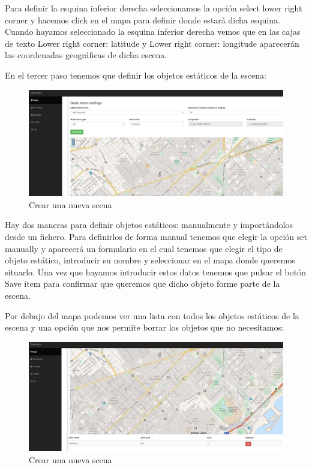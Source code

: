 Para definir la esquina inferior derecha seleccionamos la opción select lower right corner y hacemos click en el mapa para definir donde estará dicha esquina. Cuando hayamos seleccionado la esquina inferior derecha vemos que en las cajas de texto Lower right corner: latitude y Lower right corner: longitude aparecerán las coordenadas geográficas de dicha escena.

En el tercer paso tenemos que definir los objetos estáticos de la escena:

\begin{figure}[H]
	\centering\includegraphics[scale=0.3]{imagenes/capitulo9/crear-escena-3-1.jpg}
	\caption{Crear una nueva scena}
	\label{img:AddScena31}
\end{figure}

Hay dos maneras para definir objetos estáticos: manualmente y importándolos desde un fichero. Para definirlos de forma manual tenemos que elegir la opción set manually y aparecerá un formulario en el cual tenemos que elegir el tipo de objeto estático, introducir su nombre y seleccionar en el mapa donde queremos situarlo. Una vez que hayamos introducir estos datos tenemos que pulsar el botón Save item para confirmar que queremos que dicho objeto forme parte de la escena.

Por debajo del mapa podemos ver una lista con todos los objetos estáticos de la escena y una opción que nos permite borrar los objetos que no necesitamos:

\begin{figure}[H]
	\centering\includegraphics[scale=0.3]{imagenes/capitulo9/crear-escena-3-2.jpg}
	\caption{Crear una nueva scena}
	\label{img:AddScena32}
\end{figure}

